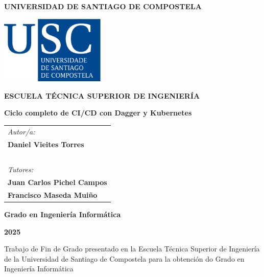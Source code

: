 \pagestyle{empty}
\begin{center}
	{\bf\Large UNIVERSIDAD DE SANTIAGO DE COMPOSTELA}
	
	\vspace{0.5cm}
	\includegraphics[width=5cm]{figuras/logo_usc.eps}
	
	\vspace{0.5cm}
	{\bf\large ESCUELA TÉCNICA SUPERIOR DE INGENIERÍA}
	
	\vspace{3cm}
	{\bf\LARGE Ciclo completo de CI/CD con Dagger y Kubernetes}
	
\end{center}

\vspace{2cm}
\hspace{4cm}\begin{tabular}{l}
	{\it\Large Autor/a:} \\
	{\bf\Large Daniel Vieites Torres} \\
	~ \\
	{\it\Large Tutores:} \\
	{\bf\Large Juan Carlos Pichel Campos} \\
	{\bf\Large Francisco Maseda Muiño} \\
\end{tabular}

\vspace{2cm}
\begin{center}
	{\bf\Large Grado en Ingeniería Informática}
	
	\vspace{0.5cm}
	{\bf\large  2025}
	
	\vspace{0.5cm}
	Trabajo de Fin de Grado presentado en la Escuela Técnica Superior de Ingeniería de la Universidad de Santiago de Compostela para la obtención do Grado en Ingeniería Informática
\end{center}

